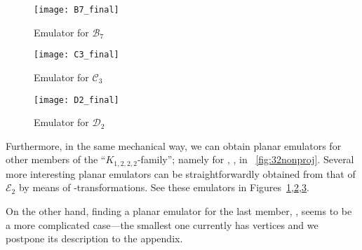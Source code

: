 \documentclass[envcountsect,envcountsame]{llncs}
\renewenvironment{accumulate}{}{}
\newenvironment{onlynoaccum}{}{}
\newcommand{\KKK}{\ensuremath{K_{1,2,2,2}}\xspace}
\newcommand{\EE}{\ensuremath{\mathcal{E}_2}\xspace}
\begin{document}
\begin{figure}[htb]
\centering
\texttt{[image: B7\_final]}
\caption{Emulator for \ensuremath{\mathcal{B}_7} }
\label{fig:B7_final}
\end{figure}
\begin{figure}[htb]
\centering
\texttt{[image: C3\_final]}
\caption{Emulator for \ensuremath{\mathcal{C}_3}}
\label{fig:C3_final}
\end{figure}
\begin{figure}[htb]
\centering
\texttt{[image: D2\_final]}
\caption{Emulator for \ensuremath{\mathcal{D}_2}}
\label{fig:D2_final}
\end{figure}

Furthermore, in the same mechanical way, we can obtain planar emulators for
other members of the ``\KKK-family''; namely for , , 
in \figurename~\ref{fig:32nonproj}.
\begin{accumulate}
Several more interesting planar emulators can be straightforwardly 
obtained from that of \EE by means of -transformations.
See these emulators in
Figures~\ref{fig:B7_final},\ref{fig:C3_final},\ref{fig:D2_final}.

\end{accumulate}
\begin{onlynoaccum}
On the other hand, finding a planar emulator
for the last member, , seems to be a more complicated case---the
smallest one currently has  vertices and we
postpone its description to the appendix.
\end{onlynoaccum}
\end{document}
